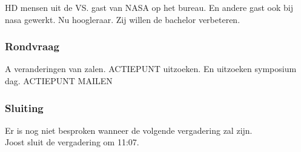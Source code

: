 HD mensen uit de VS. gast van NASA op het bureau. En andere gast ook bij nasa gewerkt. Nu hoogleraar. Zij willen de bachelor verbeteren.

\subsubsection{Rondvraag}
A veranderingen van zalen. ACTIEPUNT uitzoeken. En uitzoeken symposium dag. ACTIEPUNT MAILEN

\subsubsection{Sluiting}
Er is nog niet besproken wanneer de volgende vergadering zal zijn.\\

Joost sluit de vergadering om 11:07.\\


